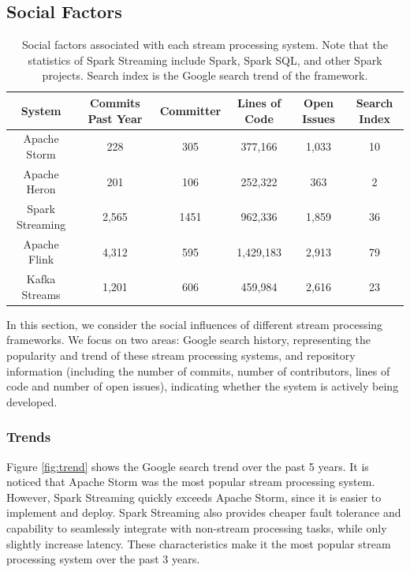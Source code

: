 \documentclass[pdftex,twocolumn,10pt,letterpaper]{article}
\begin{document}
\subsection{Social Factors}
\begin{table}[!ht]
    \centering
    \begin{tabular}{|c|c|c|c|c|c|}
         \hline
          System & 
          Commits Past Year & 
          Committer & 
          Lines of Code &
          Open Issues & 
          Search Index
          \\ 
         \hline
         Apache Storm & 228 & 305 & 377,166 & 1,033 & 10\\ 
         \hline
         Apache Heron & 201 & 106 & 252,322 & 363 & 2\\ 
         \hline
         Spark Streaming & 2,565 & 1451 & 962,336 & 1,859 & 36\\
         \hline
         Apache Flink & 4,312 & 595 & 1,429,183 & 2,913 & 79\\
         \hline
         Kafka Streams & 1,201 & 606 & 459,984 & 2,616 & 23\\
         \hline
    \end{tabular}
    \caption{
        Social factors associated with each stream processing system.
        Note that the statistics of Spark Streaming include Spark, Spark SQL, and other Spark projects.
        Search index is the Google search trend of the framework.
    }
    \label{tab:social}
\end{table}

In this section, we consider the social influences of different stream processing frameworks. We focus on two areas: Google search history, representing the popularity and trend of these stream processing systems, and repository information (including the number of commits, number of contributors, lines of code and number of open issues), indicating whether the system is actively being developed.

\subsubsection{Trends}

Figure \ref{fig:trend} shows the Google search trend over the past 5 years. It is noticed that Apache Storm was the most popular stream processing system. However, Spark Streaming quickly exceeds Apache Storm, since it is easier to implement and deploy. Spark Streaming also provides cheaper fault tolerance and capability to seamlessly integrate with non-stream processing tasks, while only slightly increase latency. These characteristics make it the most popular stream processing system over the past 3 years. 
\end{document}
